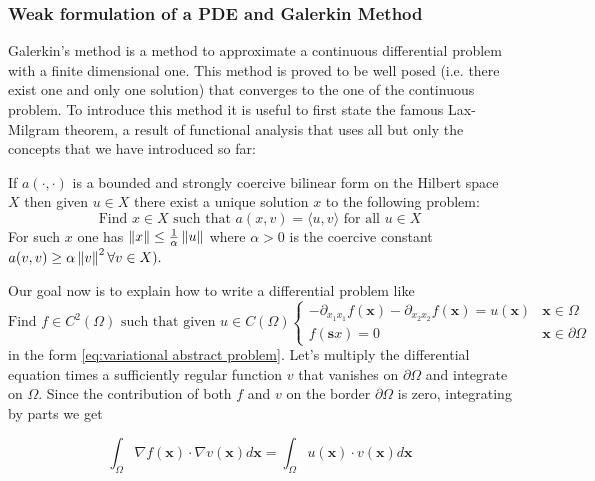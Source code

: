 \subsubsection{Weak formulation of a PDE and Galerkin Method}
Galerkin's method is a method to approximate a continuous differential problem with a finite dimensional one. This method is proved to be well posed (i.e. there exist one and only one solution) that converges to the one of the continuous problem. To introduce this method it is useful to first state the famous Lax-Milgram theorem, a result of functional analysis that uses all but only the concepts that we have introduced so far:
\vspace{0.5cm}
\begin{theorem}
If \(a(\cdot, \cdot)\) is a bounded and strongly coercive bilinear form on the Hilbert space \(X\) then given \(u \in X\) there exist a unique solution $x$ to the following problem:
\begin{equation}\label{eq:variational abstract problem}
	\text{Find }x\in X\text{ such that } a(x, v)=\langle u, v\rangle \text{ for all } u \in X
\end{equation}
For such \(x\) one has \(\|x\| \leq \frac{1}{\alpha}\left\lVert u\right\rVert\) where \(\alpha>0\) is the coercive constant \(a(v, v) \geq \alpha\left\lVert v\right\rVert^{2} \forall v \in X ) .\)
\end{theorem} 
\vspace{0.5cm}
Our goal now is to explain how to write a differential problem like 
\begin{equation}\label{eq:strong form}
\text{Find }f\in C^2(\Omega) \text{ such that given }u\in C(\Omega)
\begin{cases}
-\partial_{x_1x_1}f(\mathbf x) - \partial_{x_2x_2}f(\mathbf x) = u(\mathbf x) & \mathbf x \in \Omega\\
f(\mathbf sx) =  0& \mathbf x \in \partial \Omega
\end{cases}
\end{equation}
in the form \ref{eq:variational abstract problem}. Let's multiply the differential equation times a sufficiently regular function $v$ that vanishes on $\partial \Omega$ and integrate on $\Omega$. Since the contribution of both $f$ and $v$ on the border $\partial \Omega$ is zero, integrating by parts we get

\begin{equation}\label{eq:int by parts}
	\int_\Omega \nabla f(\mathbf x)\cdot\nabla v(\mathbf x) d\mathbf x = \int_\Omega  u(\mathbf x)\cdot v(\mathbf x)d\mathbf x
\end{equation}

